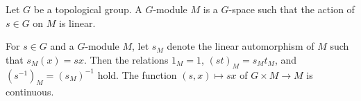 Let $G$ be a topological group. A $G$-module $M$ is a $G$-space such that the action of $s \in G$ on $M$ is linear.

For $s \in G$ and a $G$-module $M$, let $s_M$ denote the linear automorphism of $M$ such that $s_M(x) = sx$. Then the relations $1_M = 1$, $(st)_M = s_M t_M$, and $(s^{-1})_M = (s_M)^{-1}$ hold. The function $(s, x) \mapsto sx$ of $G \times M \rightarrow M$ is continuous.
